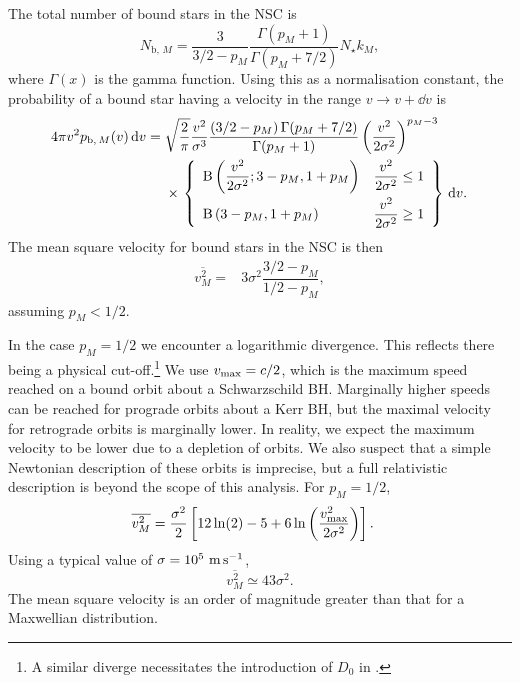 The total number of bound stars in the NSC is
\begin{equation}
N_{\mathrm{b},\,M} = \dfrac{3}{3/2 - p_M}\dfrac{\Gamma(p_M + 1)}{\Gamma(p_M + 7/2)}N_\star k_M,
\end{equation}
where $\Gamma(x)$ is the gamma function. Using this as a normalisation constant, the probability of a bound star having a velocity in the range $v \rightarrow v + \dd v$ is
\begin{align}
4\pi v^2 p_{\mathrm{b},\,M}(v) \,\dd v = {} & \sqrt{\dfrac{2}{\pi}} \dfrac{v^2}{\sigma^3} \dfrac{\left(3/2 - p_M\right)\Gamma(p_M + 7/2)}{\Gamma(p_M + 1)} \left(\dfrac{v^2}{2\sigma^2}\right)^{p_M - 3} \nonumber \\* 
 {} & \times \left. \left\{\begin{array}{lr}
\Beta\left(\dfrac{v^2}{2\sigma^2}; 3 - p_M, 1 + p_M\right) \vspace{1mm} & \dfrac{v^2}{2\sigma^2} \leq 1 \\
\Beta\left(3 - p_M, 1 + p_M\right) & \dfrac{v^2}{2\sigma^2} \geq 1\end{array}\right\}\,\dd v. \right.
\end{align}
The mean square velocity for bound stars in the NSC is then
\begin{align}
\overline{v^2_{M}} = {} & 3\sigma^2\dfrac{3/2 - p_M}{1/2 - p_M},
\end{align}
assuming $p_M < 1/2$.

In the case $p_M = 1/2$ we encounter a logarithmic divergence. This reflects there being a physical cut-off.\footnote{A similar diverge necessitates the introduction of $D_0$ in .} We use $v_\mathrm{max} = c/2$, which is the maximum speed reached on a bound orbit about a Schwarzschild BH. Marginally higher speeds can be reached for prograde orbits about a Kerr BH, but the maximal velocity for retrograde orbits is marginally lower. In reality, we expect the maximum velocity to be lower due to a depletion of orbits. We also suspect that a simple Newtonian description of these orbits is imprecise, but a full relativistic description is beyond the scope of this analysis. For $p_M = 1/2$,
\begin{align}
\overline{v^2_{M}} = {} & \dfrac{\sigma^2}{2}\left[12\ln(2) - 5 + 6 \ln\left(\dfrac{v_\mathrm{max}^2}{2\sigma^2}\right)\right].
\end{align}
Using a typical value of $\sigma = 10^5~\mathrm{m\,s^{-1}}$,
\begin{equation}
\overline{v^2_{M}} \simeq 43\sigma^2.
\end{equation}
The mean square velocity is an order of magnitude greater than that for a Maxwellian distribution.

